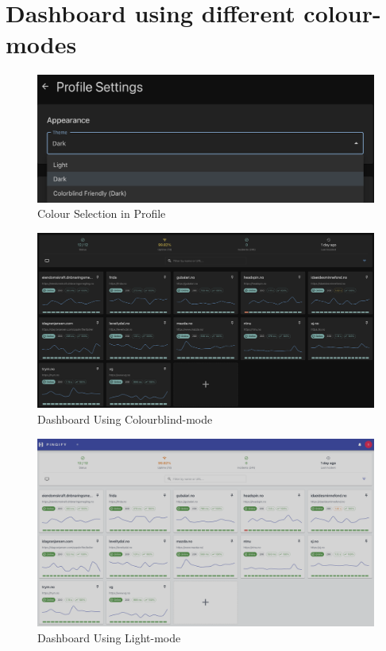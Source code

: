 \section{Dashboard using different colour-modes}
\label{app:colourblind_mode}

\begin{figure}
    \centering
    \includegraphics[width=1\linewidth]{figures//colourblind/colourblind_selector.png}
    \caption{Colour Selection in Profile}
    \label{fig:colourselector}
\end{figure}


\begin{figure}
    \centering
    \includegraphics[width=1\linewidth]{figures//colourblind/colourblindmode.png}
    \caption{Dashboard Using Colourblind-mode}
    \label{fig:colourblind}
\end{figure}


\begin{figure}
    \centering
    \includegraphics[width=1\linewidth]{figures//colourblind/lightmode.png}
    \caption{Dashboard Using Light-mode}
    \label{fig:lightmode}
\end{figure}